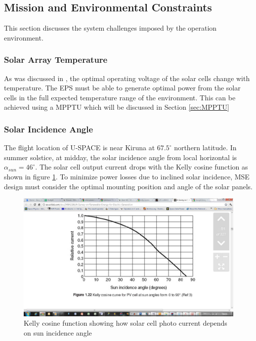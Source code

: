 \subsection{Mission and Environmental Constraints}
\label{subsec:environmental_requirements}
This section discusses the system challenges imposed by the operation environment.

\subsubsection*{Solar Array Temperature}
As was discussed in \cite{PDR}, the optimal operating voltage of the solar cells change with temperature. The \ac{EPS} must be able to generate optimal power from the solar cells in the full expected temperature range of the environment. This can be achieved using a \ac{MPPTU} which will be discussed in Section \ref{sec:MPPTU}

\subsubsection*{Solar Incidence Angle}
The flight location of U-SPACE is near Kiruna at $67.5^{\circ}$ northern latitude. In summer solstice, at midday, the solar incidence angle from local horizontal is $\alpha_{sun}=46^{\circ}$\cite[eq. 1]{PDR}. The solar cell output current drops with the Kelly cosine function as shown in figure \ref{fig:KellyCosine}. To minimize power losses due to inclined solar incidence, \ac{MSE} design must consider the optimal mounting position and angle of the solar panels.
%
\begin{figure}[H]
\centering
\includegraphics[scale=0.4]{figures/fig_KellyCosine}
\caption[Kelly cosine function]{Kelly cosine function showing how solar cell photo current depends on sun incidence angle}
\label{fig:KellyCosine}
\end{figure}
%
